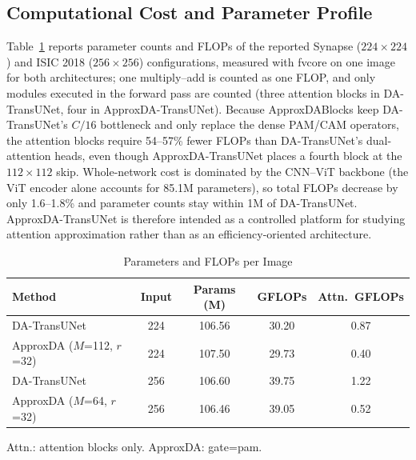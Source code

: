 \subsection{Computational Cost and Parameter Profile}
\label{sec:efficiency}

Table~\ref{tab:efficiency} reports parameter counts and FLOPs of the reported Synapse ($224{\times}224$) and ISIC 2018 ($256{\times}256$) configurations, measured with fvcore on one image for both architectures; one multiply--add is counted as one FLOP, and only modules executed in the forward pass are counted (three attention blocks in DA-TransUNet, four in ApproxDA-TransUNet). Because ApproxDABlocks keep DA-TransUNet's $C/16$ bottleneck and only replace the dense PAM/CAM operators, the attention blocks require 54--57\% fewer FLOPs than DA-TransUNet's dual-attention heads, even though ApproxDA-TransUNet places a fourth block at the $112{\times}112$ skip. Whole-network cost is dominated by the CNN--ViT backbone (the ViT encoder alone accounts for 85.1M parameters), so total FLOPs decrease by only 1.6--1.8\% and parameter counts stay within 1M of DA-TransUNet. ApproxDA-TransUNet is therefore intended as a controlled platform for studying attention approximation rather than as an efficiency-oriented architecture.

\begin{table}[ht]
  \caption{Parameters and FLOPs per Image}
  \label{tab:efficiency}
  \centering
  \setlength{\tabcolsep}{3pt}
  \begin{tabular}{lcccc}
    \toprule
    Method & Input & Params (M) & GFLOPs & Attn.\ GFLOPs \\
    \midrule
    DA-TransUNet~\cite{sun2024datransunet}  & 224 & 106.56 & 30.20 & 0.87 \\
    ApproxDA ($M$=112, $r$=32)              & 224 & 107.50 & 29.73 & 0.40 \\
    \midrule
    DA-TransUNet~\cite{sun2024datransunet}  & 256 & 106.60 & 39.75 & 1.22 \\
    ApproxDA ($M$=64, $r$=32)               & 256 & 106.46 & 39.05 & 0.52 \\
    \bottomrule
  \end{tabular}\par\vspace{3pt}
  \begin{minipage}{\linewidth}\footnotesize Attn.: attention blocks only. ApproxDA: gate=pam.\end{minipage}
\end{table}
